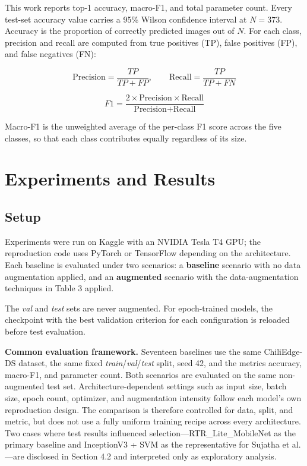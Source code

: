 This work reports top-1 accuracy, macro-F1, and total parameter count. Every test-set accuracy value carries a 95\% Wilson confidence interval at $N = 373$. Accuracy is the proportion of correctly predicted images out of $N$. For each class, precision and recall are computed from true positives (TP), false positives (FP), and false negatives (FN):

\begin{equation}
\text{Precision} = \frac{TP}{TP+FP}, \qquad \text{Recall} = \frac{TP}{TP+FN}
\end{equation}

\begin{equation}
F1 = \frac{2 \times \text{Precision} \times \text{Recall}}{\text{Precision}+\text{Recall}}
\end{equation}

Macro-F1 is the unweighted average of the per-class F1 score across the five classes, so that each class contributes equally regardless of its size.

\FloatBarrier

\section{Experiments and Results}\label{experiments-and-results}

\subsection{Setup}\label{setup}

Experiments were run on Kaggle with an NVIDIA Tesla T4 GPU; the reproduction code uses PyTorch or TensorFlow depending on the architecture. Each baseline is evaluated under two scenarios: a \textbf{baseline} scenario with no data augmentation applied, and an \textbf{augmented} scenario with the data-augmentation techniques in Table 3 applied.

The \emph{val} and \emph{test} sets are never augmented. For epoch-trained models, the checkpoint with the best validation criterion for each configuration is reloaded before test evaluation.

\textbf{Common evaluation framework.} Seventeen baselines use the same ChiliEdge-DS dataset, the same fixed \emph{train}/\emph{val}/\emph{test} split, seed 42, and the metrics accuracy, macro-F1, and parameter count. Both scenarios are evaluated on the same non-augmented test set. Architecture-dependent settings such as input size, batch size, epoch count, optimizer, and augmentation intensity follow each model's own reproduction design. The comparison is therefore controlled for data, split, and metric, but does not use a fully uniform training recipe across every architecture. Two cases where test results influenced selection---RTR\_Lite\_MobileNet \cite{duhan2025} as the primary baseline and InceptionV3 + SVM as the representative for Sujatha et al. \cite{sujatha2025}---are disclosed in Section 4.2 and interpreted only as exploratory analysis.

